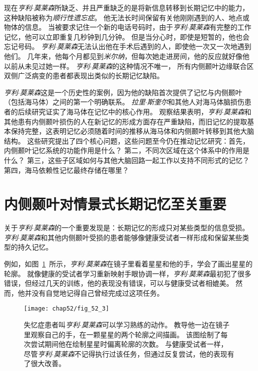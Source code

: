 现在\textit{亨利$\cdot$莫莱森}所缺乏、并且严重缺乏的是将新信息转移到长期记忆中的能力，这种缺陷被称为\textit{顺行性遗忘症}。
他无法长时间保留有关他刚刚遇到的人、地点或物体的信息。
当被要求记住一个新的电话号码时，由于\textit{亨利$\cdot$莫莱森}有完整的工作记忆，他可以立即重复几秒钟到几分钟。
但是当分心时，即使是短暂的，他也会忘记号码。
\textit{亨利$\cdot$莫莱森}无法认出他在手术后遇到的人，即使他一次又一次地遇到他们。
几年来，他每个月都见到\textit{米尔纳}，但每次她走进房间，他的反应就好像他以前从未见过她一样。
\textit{亨利$\cdot$莫莱森}的这种情况不唯一，
所有内侧颞叶边缘联合区双侧广泛病变的患者都表现出类似的长期记忆缺陷。


\textit{亨利$\cdot$莫莱森}这是一个历史性的案例，因为他的缺陷首次提供了记忆与内侧颞叶（包括海马体）之间的第一个明确联系。
\textit{拉里$\cdot$斯奎尔}和其他人对海马体脑损伤患者的后续研究证实了海马体在记忆中的核心作用。
观察结果表明，\textit{亨利$\cdot$莫莱森}和其他患有内侧颞叶损伤的人在新记忆的形成方面存在严重缺陷，而旧记忆的提取基本保持完整，这表明记忆必须随着时间的推移从海马体和内侧颞叶转移到其他大脑结构。
这些研究提出了四个核心问题，这些问题至今仍在推动记忆研究：首先，内侧颞叶记忆系统的功能作用是什么？
第二，不同次区域在这个体系中的作用是什么？
第三，这些子区域如何与其他大脑回路一起工作以支持不同形式的记忆？
第四，海马依赖性记忆最终存储在哪里？



\section{内侧颞叶对情景式长期记忆至关重要}

关于\textit{亨利$\cdot$莫莱森}的一个重要发现是：长期记忆的形成只对某些类型的信息受损。
\textit{亨利$\cdot$莫莱森}和其他内侧颞叶受损的患者能够像健康受试者一样形成和保留某些类型的持久记忆。


例如，如图~\ref{fig:52_3}~所示，\textit{亨利$\cdot$莫莱森}在镜子里看着星星和他的手，学会了画出星星的轮廓。
就像健康的受试者学习重新映射手眼协调一样，\textit{亨利$\cdot$莫莱森}最初犯了很多错误，但经过几天的训练，他的表现没有错误，可以与健康受试者相媲美。
然而，他并没有自觉地记得自己曾经完成过这项任务。


\begin{figure}[htbp]
	\centering
	\texttt{[image: chap52/fig\_52\_3]}
	\caption{失忆症患者叫\textit{亨利$\cdot$莫莱森}可以学习熟练的动作。
		教导他一边在镜子里观察自己的手，在一颗星星的两个轮廓之间描画。
		该图绘制了每次尝试期间他在绘制星星时偏离轮廓的次数。
		与健康受试者一样，尽管\textit{亨利$\cdot$莫莱森}不记得执行过该任务，但通过反复尝试，他的表现有了很大改善\cite{blakemore1977mechanics}。}
	\label{fig:52_3}
\end{figure}


